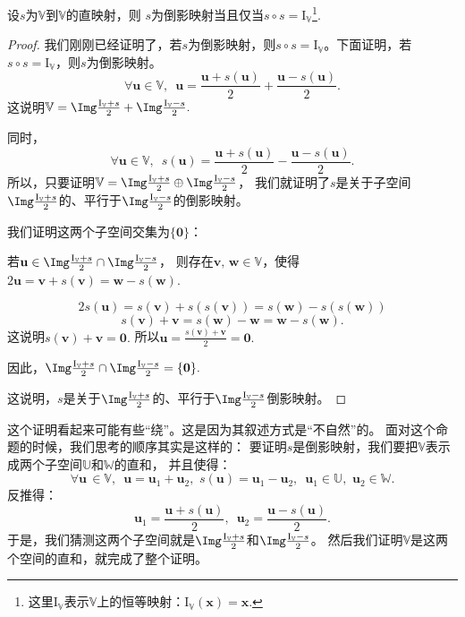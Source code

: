 \documentclass[12pt,UTF8]{ctexbook}
\begin{document}
\begin{pp}\label{pp:3_5}
    设$s$为$\mathbb{V}$到$\mathbb{V}$的直映射，则
    $s$为倒影映射当且仅当$s\circ s = \mathrm{I}_{\mathbb{V}}$\footnote{这里$\mathrm{I}_{\mathbb{V}}$表示$\mathbb{V}$上的恒等映射：$\mathrm{I}_{\mathbb{V}}(\mathbf{x}) = \mathbf{x}.$}.
\end{pp}
\begin{proof} %
    我们刚刚已经证明了，若$s$为倒影映射，则$s\circ s = \mathrm{I}_{\mathbb{V}}$。下面证明，若$s\circ s = \mathrm{I}_{\mathbb{V}}$，则$s$为倒影映射。
    $$\forall \mathbf{u}\in\mathbb{V}, \,\,\, \mathbf{u} = \frac{\mathbf{u} + s(\mathbf{u})}{2} + \frac{\mathbf{u} - s(\mathbf{u})}{2}.$$
    这说明$\mathbb{V}=\Img \frac{\mathrm{I}_{\mathbb{V}} + s}{2} + \Img \frac{\mathrm{I}_{\mathbb{V}} - s}{2}.$

    同时，
    $$\forall \mathbf{u}\in\mathbb{V}, \,\,\, s(\mathbf{u}) = \frac{\mathbf{u} + s(\mathbf{u})}{2} - \frac{\mathbf{u} - s(\mathbf{u})}{2}.$$
    所以，只要证明$\mathbb{V}=\Img \frac{\mathrm{I}_{\mathbb{V}} + s}{2} \oplus \Img \frac{\mathrm{I}_{\mathbb{V}} - s}{2}$，
    我们就证明了$s$是关于子空间$\Img \frac{\mathrm{I}_{\mathbb{V}} + s}{2}$的、平行于$\Img \frac{\mathrm{I}_{\mathbb{V}} - s}{2}$的倒影映射。

    我们证明这两个子空间交集为$\{\mathbf{0}\}$：

    若$\mathbf{u} \in \Img \frac{\mathrm{I}_{\mathbb{V}} + s}{2} \cap \Img \frac{\mathrm{I}_{\mathbb{V}} - s}{2}$，
    则存在$\mathbf{v},\,\mathbf{w} \in \mathbb{V}$，使得$2\mathbf{u} = \mathbf{v} + s(\mathbf{v}) = \mathbf{w} - s(\mathbf{w}).$

    $$ 2s(\mathbf{u}) = s(\mathbf{v}) + s(s(\mathbf{v})) = s(\mathbf{w}) - s(s(\mathbf{w}))$$
    $$ s(\mathbf{v}) + \mathbf{v} = s(\mathbf{w}) - \mathbf{w} = \mathbf{w} - s(\mathbf{w}).$$
    这说明$s(\mathbf{v}) + \mathbf{v} = \mathbf{0}.$ 所以$\mathbf{u} = \frac{s(\mathbf{v}) + \mathbf{v}}{2} = \mathbf{0}.$

    因此，$\Img \frac{\mathrm{I}_{\mathbb{V}} + s}{2} \cap \Img \frac{\mathrm{I}_{\mathbb{V}} - s}{2} = \{\mathbf{0}\}.$

    这说明，$s$是关于$\Img \frac{\mathrm{I}_{\mathbb{V}} + s}{2}$的、平行于$\Img \frac{\mathrm{I}_{\mathbb{V}} - s}{2}$倒影映射。

\end{proof}


这个证明看起来可能有些“绕”。这是因为其叙述方式是“不自然”的。
面对这个命题的时候，我们思考的顺序其实是这样的：
要证明$s$是倒影映射，我们要把$\mathbb{V}$表示成两个子空间$\mathbb{U}$和$\mathbb{W}$的直和，
并且使得：
$$ \forall \mathbf{u} \,\in \mathbb{V},\,\,\, \mathbf{u} = \mathbf{u}_1 + \mathbf{u}_2, \,\, s(\mathbf{u}) = \mathbf{u}_1 - \mathbf{u}_2,\,\,\, \mathbf{u}_1 \in\mathbb{U},\,\,\mathbf{u}_2 \in\mathbb{W}.$$
反推得：
$$ \mathbf{u}_1 = \frac{\mathbf{u} + s(\mathbf{u})}{2},\,\,\, \mathbf{u}_2 = \frac{\mathbf{u} - s(\mathbf{u})}{2}.$$ 
于是，我们猜测这两个子空间就是$\Img \frac{\mathrm{I}_{\mathbb{V}} + s}{2}$和$\Img \frac{\mathrm{I}_{\mathbb{V}} - s}{2}$。
然后我们证明$\mathbb{V}$是这两个空间的直和，就完成了整个证明。
\end{document}
